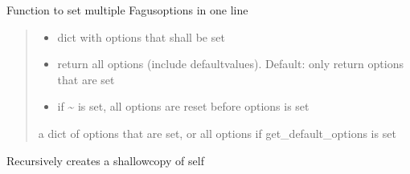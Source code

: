 \documentclass[a4paper,10pt,english]{sphinxmanual}
\begin{document}
\begin{fulllineitems}
\begin{fulllineitems}
\label{\detokenize{fagus:fagus.Fagus.options}}
\pysigstartsignatures
{}
\pysigstopsignatures
\sphinxAtStartPar
Function to set multiple Fagus\sphinxhyphen{}options in one line
\begin{quote}\begin{description}
\begin{itemize}
\item {}
\sphinxAtStartPar
{} \textendash{} dict with options that shall be set

\item {}
\sphinxAtStartPar
{} \textendash{} return all options (include default\sphinxhyphen{}values). Default: only return options that are set

\item {}
\sphinxAtStartPar
{} \textendash{} if \textasciitilde{} is set, all options are reset before options is set

\end{itemize}

\sphinxAtStartPar
a dict of options that are set, or all options if get\_default\_options is set

\end{description}\end{quote}

\end{fulllineitems}


\begin{fulllineitems}
\label{\detokenize{fagus:fagus.Fagus.__copy__}}
\pysigstartsignatures
{}
\pysigstopsignatures
\sphinxAtStartPar
Recursively creates a shallow\sphinxhyphen{}copy of self


\end{fulllineitems}
\end{fulllineitems}
\end{document}
